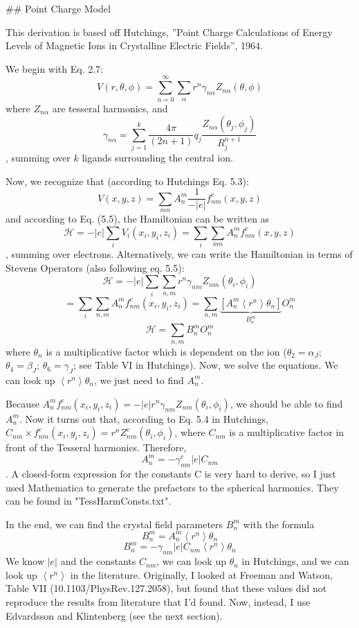## Point Charge Model

This derivation is based off Hutchings, ''Point Charge Calculations
of Energy Levels of Magnetic Ions in Crystalline Electric Fields'',
1964.


We begin with Eq. 2.7:
$$
V(r,\theta,\phi)=\sum_{n=0}^{\infty}\sum_{\alpha}r^{n}\gamma_{n\alpha}Z_{n\alpha}(\theta,\phi)
$$
where $Z_{n\alpha}$ are tesseral harmonics, and 
\begin{equation}
\gamma_{n\alpha}=\sum_{j=1}^{k}\frac{4\pi}{(2n+1)}q_{j}\frac{Z_{n\alpha}(\theta_{j},\phi_{j})}{R_{j}^{n+1}}
\end{equation}
, summing over $k$ ligands surrounding the central ion. 

Now, we recognize that (according to Hutchings Eq. 5.3): 
$$V(x,y,z)=\sum_{mn}A_{n}^{m}\frac{1}{-|e|}f_{nm}^{c}(x,y,z)$$
and according to Eq. (5.5), the Hamiltonian can be written as
$$
\mathcal{H}=-|e|\sum_{i}V_{i}(x_{i},y_{i},z_{i})=\sum_{i}\sum_{mn}A_{n}^{m}f_{nm}^{c}(x,y,z)
$$
, summing over electrons. Alternatively, we can write the Hamiltonian
in terms of Stevens Operators (also following eq. 5.5):
$$
\mathcal{H}=-|e|\sum_{i}\sum_{n,m}r^{n}\gamma_{nm}Z_{nm}(\theta_{i},\phi_{i})
$$
$$
=\sum_{i}\sum_{n,m}A_{n}^{m}f_{nm}^{c}(x_{i},y_{i},z_{i})=\sum_{n,m}\underbrace{\left[A_{n}^{m}\left\langle r^{n}\right\rangle \theta_{n}\right]}_{B_{n}^{m}}O_{n}^{m}
$$
$$ \mathcal{H} =\sum_{n,m} B_{n}^{m}O_{n}^{m} $$
where $\theta_{n}$ is a multiplicative factor which is dependent
on the ion ($\theta_{2}=\alpha_{J}$; $\theta_{4}=\beta_{J}$; $\theta_{6}=\gamma_{J}$;
see Table VI in Hutchings). Now, we solve the equations. 
We can look up $\left\langle r^{n}\right\rangle \theta_{n}$,
we just need to find $A_{n}^{m}$.

Because $A_{n}^{m}f_{nm}^{c}(x_{i},y_{i},z_{i})=-|e|r^{n}\gamma_{nm}Z_{nm}(\theta_{i},\phi_{i})$,
we should be able to find $A_{n}^{m}$. Now it turns out that, according
to Eq. 5.4 in Hutchings, $C_{nm}\times f_{nm}^{c}(x_{i},y_{i},z_{i})=r^{n}Z_{nm}^{c}(\theta_{i},\phi_{i})$,
where $C_{nm}$ is a multiplicative factor in front of the Tesseral
harmonics. Therefore,
$$
A_{n}^{m}=-\gamma_{nm}^{c}|e|C_{nm}
$$
. A closed-form expression for the constants C is very hard to derive,
so I just used Mathematica to generate the prefactors to the spherical
harmonics. They can be found in "TessHarmConsts.txt".



In the end, we can find the crystal field parameters $B_{n}^{m}$
with the formula
$$
B_{n}^{m}=A_{n}^{m}\left\langle r^{n}\right\rangle \theta_{n}
$$
\begin{equation}
\boxed{B_{n}^{m}=-\gamma_{nm}|e|C_{nm}\left\langle r^{n}\right\rangle \theta_{n}}
\end{equation}
We know $|e|$ and the constants $C_{nm}$, we can look up $\theta_{n}$
in Hutchings, and we can look up $\left\langle r^{n}\right\rangle $
in the literature. Originally, I looked at Freeman and Watson, Table
VII (10.1103/PhysRev.127.2058), but found that these values did not
reproduce the results from literature that I'd found. Now, instead, I use Edvardsson and Klintenberg (see the next section).

